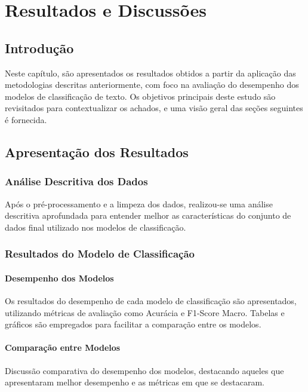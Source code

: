 \chapter{Resultados e Discussões}

\section{Introdução}

Neste capítulo, são apresentados os resultados obtidos a partir da aplicação das metodologias descritas anteriormente, com foco na avaliação do desempenho dos modelos de classificação de texto. Os objetivos principais deste estudo são revisitados para contextualizar os achados, e uma visão geral das seções seguintes é fornecida.

\section{Apresentação dos Resultados}

\subsection{Análise Descritiva dos Dados}

Após o pré-processamento e a limpeza dos dados, realizou-se uma análise descritiva aprofundada para entender melhor as características do conjunto de dados final utilizado nos modelos de classificação.

\subsection{Resultados do Modelo de Classificação}

\subsubsection{Desempenho dos Modelos}

Os resultados do desempenho de cada modelo de classificação são apresentados, utilizando métricas de avaliação como Acurácia e F1-Score Macro. Tabelas e gráficos são empregados para facilitar a comparação entre os modelos.

\subsubsection{Comparação entre Modelos}

Discussão comparativa do desempenho dos modelos, destacando aqueles que apresentaram melhor desempenho e as métricas em que se destacaram.

